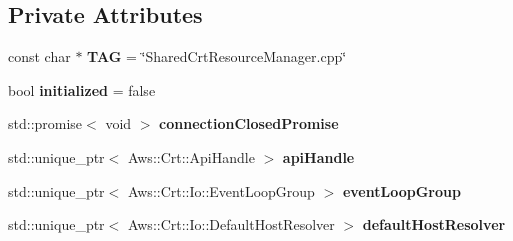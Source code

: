 \subsection*{Private Attributes}
\begin{DoxyCompactItemize}
\item 
\mbox{\label{class_aws_1_1_iot_1_1_device_client_1_1_shared_crt_resource_manager_a511ea1b492b39a073e486894ed3f0506}} 
const char $\ast$ {\bfseries T\+AG} = \char`\"{}Shared\+Crt\+Resource\+Manager.\+cpp\char`\"{}
\item 
\mbox{\label{class_aws_1_1_iot_1_1_device_client_1_1_shared_crt_resource_manager_a1a2e7fffece11a2c67f9080bc0ac5bc8}} 
bool {\bfseries initialized} = false
\item 
\mbox{\label{class_aws_1_1_iot_1_1_device_client_1_1_shared_crt_resource_manager_a57a29a339f8b7e9232c44a52bdd1e360}} 
std\+::promise$<$ void $>$ {\bfseries connection\+Closed\+Promise}
\item 
\mbox{\label{class_aws_1_1_iot_1_1_device_client_1_1_shared_crt_resource_manager_a77f6a022b928d747cf95e43a75f851ff}} 
std\+::unique\+\_\+ptr$<$ Aws\+::\+Crt\+::\+Api\+Handle $>$ {\bfseries api\+Handle}
\item 
\mbox{\label{class_aws_1_1_iot_1_1_device_client_1_1_shared_crt_resource_manager_af10d2d513b04cb58abc62641fbf3ff05}} 
std\+::unique\+\_\+ptr$<$ Aws\+::\+Crt\+::\+Io\+::\+Event\+Loop\+Group $>$ {\bfseries event\+Loop\+Group}
\item 
\mbox{\label{class_aws_1_1_iot_1_1_device_client_1_1_shared_crt_resource_manager_a9d7eba2a8ce701d6bce6db4050ccad76}} 
std\+::unique\+\_\+ptr$<$ Aws\+::\+Crt\+::\+Io\+::\+Default\+Host\+Resolver $>$ {\bfseries default\+Host\+Resolver}
\item 
\mbox{\label{class_aws_1_1_iot_1_1_device_client_1_1_shared_crt_resource_manager_ad36c486449d6ca3592e11172fb8be07b}} 

\end{DoxyCompactItemize}
